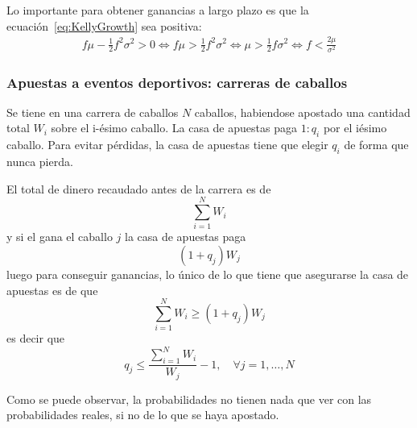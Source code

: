 Lo importante para obtener ganancias a largo plazo es que la ecuación~\eqref{eq:KellyGrowth} sea positiva:
\begin{align*}
    f\mu - \frac{1}{2}f^2\sigma^2 > 0 \Leftrightarrow f\mu > \frac{1}{2}f^2\sigma^2 \Leftrightarrow \mu > \frac{1}{2}f\sigma^2 \Leftrightarrow \boxed{f < \frac{2\mu}{\sigma^2}}
\end{align*}







\subsubsection{Apuestas a eventos deportivos: carreras de caballos}
Se tiene en una carrera de caballos $N$ caballos, habiendose apostado una cantidad total $W_i$ sobre el i-ésimo caballo. La casa de apuestas paga $1:q_i$ por el iésimo caballo. Para evitar pérdidas, la casa de apuestas tiene que elegir $q_i$ de forma que nunca pierda.

El total de dinero recaudado antes de la carrera es de
\[
    \sum_{i=1}^N W_i
\]
y si el gana el caballo $j$ la casa de apuestas paga 
\[
    (1+q_j)W_j
\]
luego para conseguir ganancias, lo único de lo que tiene que asegurarse la casa de apuestas es de que
\[
    \sum_{i=1}^N W_i \geq (1+q_j)W_j
\]
es decir que
\[
    \boxed{q_j \leq \frac{\sum_{i=1}^N W_i}{W_j} - 1, \quad \forall j=1,\ldots,N}
\]

Como se puede observar, la probabilidades no tienen nada que ver con las probabilidades reales, si no de lo que se haya apostado.







